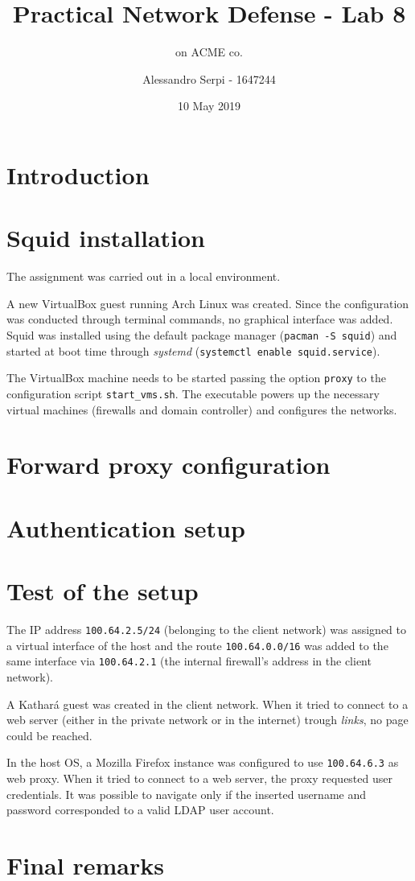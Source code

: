 \documentclass[draft]{homework}
\title{Practical Network Defense - Lab 8}
\subtitle{\sq on ACME co.}
\author{Alessandro Serpi - 1647244}
\date{10 May 2019}
\newcommand{\kat}{Kathará\xspace}
\newcommand{\sq}{Squid\xspace}
\newcommand{\vb}{VirtualBox\xspace}
\begin{document}
    \maketitle
    \tableofcontents
    
    
    \pagebreak
    \section{Introduction}
    
    
    \section{\sq installation}
    The assignment was carried out in a local environment.
    
    A new \vb guest running Arch Linux was created.
    Since the configuration was conducted through terminal commands, no graphical interface was added.
    Squid was installed using the default package manager (\texttt{pacman -S squid}) and started at boot time through \textit{systemd} (\texttt{systemctl enable squid.service}).
    
    The \vb machine needs to be started passing the option \texttt{proxy} to the configuration script \texttt{start\_vms.sh}.
    The executable powers up the necessary virtual machines (firewalls and domain controller) and configures the networks.
    
    
    \section{Forward proxy configuration}
    
    
    \section{Authentication setup}
    
    
    \section{Test of the setup}
    The IP address \texttt{100.64.2.5/24} (belonging to the client network) was assigned to a virtual interface of the host and the route \texttt{100.64.0.0/16} was added to the same interface via \texttt{100.64.2.1} (the internal firewall's address in the client network).
    
    A \kat guest was created in the client network.
    When it tried to connect to a web server (either in the private network or in the internet) trough \textit{links}, no page could be reached.
    
    In the host OS, a Mozilla Firefox instance was configured to use \texttt{100.64.6.3} as web proxy.
    When it tried to connect to a web server, the proxy requested user credentials.
    It was possible to navigate only if the inserted username and password corresponded to a valid LDAP user account.
    
    
    \section{Final remarks}
\end{document}
